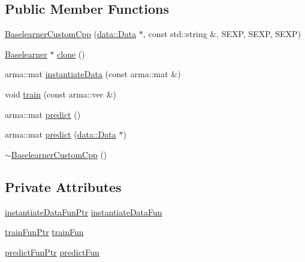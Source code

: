 \subsection*{Public Member Functions}
\begin{DoxyCompactItemize}
\item 
\hyperlink{classblearner_1_1_baselearner_custom_cpp_a7714c44164d0f763a861217ff2d53480}{Baselearner\+Custom\+Cpp} (\hyperlink{classdata_1_1_data}{data\+::\+Data} $\ast$, const std\+::string \&, S\+E\+XP, S\+E\+XP, S\+E\+XP)
\item 
\hyperlink{classblearner_1_1_baselearner}{Baselearner} $\ast$ \hyperlink{classblearner_1_1_baselearner_custom_cpp_a8478407ac4d8ed118fd1381f65df150a}{clone} ()
\item 
arma\+::mat \hyperlink{classblearner_1_1_baselearner_custom_cpp_ae130d3b469eff32c8e0be12d925cf88f}{instantiate\+Data} (const arma\+::mat \&)
\item 
void \hyperlink{classblearner_1_1_baselearner_custom_cpp_a7437b1175498b928d3202b586527d2c4}{train} (const arma\+::vec \&)
\item 
arma\+::mat \hyperlink{classblearner_1_1_baselearner_custom_cpp_a88c17ed1e32255e482f34695e06e7d25}{predict} ()
\item 
arma\+::mat \hyperlink{classblearner_1_1_baselearner_custom_cpp_a55fb45a929fea01f79fa3dcad7698174}{predict} (\hyperlink{classdata_1_1_data}{data\+::\+Data} $\ast$)
\item 
\hyperlink{classblearner_1_1_baselearner_custom_cpp_a67aa938d71013c6e931d3edc563935bb}{$\sim$\+Baselearner\+Custom\+Cpp} ()
\end{DoxyCompactItemize}
\subsection*{Private Attributes}
\begin{DoxyCompactItemize}
\item 
\hyperlink{namespaceblearner_a10cec16134a934fb9defbdc2c2011f2a}{instantiate\+Data\+Fun\+Ptr} \hyperlink{classblearner_1_1_baselearner_custom_cpp_ab8d8e9a2bc502286ad1cd1ea5e646270}{instantiate\+Data\+Fun}
\item 
\hyperlink{namespaceblearner_a5e2b38edf05e32681bee136af9ae505d}{train\+Fun\+Ptr} \hyperlink{classblearner_1_1_baselearner_custom_cpp_ab04bffb15f84320d325821edb97ef9f5}{train\+Fun}
\item 
\hyperlink{namespaceblearner_a93d5b51440d434704d2bde9dee652f6e}{predict\+Fun\+Ptr} \hyperlink{classblearner_1_1_baselearner_custom_cpp_aa5f2ac8345bddaf143d47d7c88e993c5}{predict\+Fun}
\end{DoxyCompactItemize}
